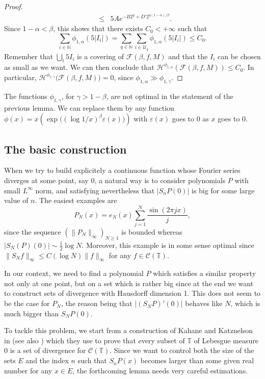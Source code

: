 \documentclass[11pt,a4paper]{amsart}
\theoremstyle{plain}
\begin{document}
\begin{proof}
\begin{eqnarray*}
&\leq&5Ae^{-B2^q+D'2^{q(1-\alpha)/\beta}}.
\end{eqnarray*}
Since $1-\alpha<\beta$, this shows that there exists $C_0<+\infty$ such that 
$$\sum_{i\in\mathbb N}\phi_{1,\alpha}(5|I_i|)=\sum_{q\in\mathbb
N}\sum_{i\in\mathcal U_q}\phi_{1,\alpha}(5|I_i|)\le C_0.$$
Remember that $\bigcup_i5I_i$ is a covering of $\mathcal F(\beta,f,M)$ and
that the $I_i$ can be chosen as small as we want. We can then conclude that 
$\mathcal H^{\phi_{1,\alpha}}(\mathcal F(\beta,f,M))\le C_0$. In particular, $\mathcal H^{\phi_{1,\gamma}}\big(\mathcal F(\beta,f,M)\big)=0$,
since $\phi_{1,\alpha}\gg\phi_{1,\gamma}$.
\end{proof}

\begin{remark}
The functions $\phi_{1,\gamma}$, for $\gamma>1-\beta$, are not optimal in the statement of the previous lemma.
We can replace them by any function $\phi(x)=x\left(\exp\big((\log 1/x)^\beta{\varepsilon}(x)\big)\right)$ with 
${\varepsilon}(x)$ goes to 0 as $x$ goes to 0.
\end{remark}

\subsection{The basic construction}
When we try to build explicitely a continuous function whose Fourier series diverges at some point, say 0, a natural way is to consider
polynomials $P$ with small $L^\infty$ norm, and satisfying nevertheless that
$|S_nP(0)|$ is big for some large value of $n$. The easiest examples are 
$$P_N(x)=e_N(x) \sum_{j=1}^N \frac{\sin(2\pi jx)}{j},$$
since the sequence $(\|P_N\|_\infty)_{N\ge 1}$ is bounded whereas $|S_N(P)(0)|\sim \frac12\log N$. Moreover, this example is in some sense optimal
since $\|S_N f\|_\infty\leq C(\log N)\|f\|_{\infty}$ for any $f\in \mathcal C({\mathbb T})$.

In our context, we need to find a polynomial $P$ which satisfies a similar property not only at one point, but on a set which is rather big since at the end we want to construct
sets of divergence with Hausdorff dimension 1. This does not seem to be the case for $P_N$, the reason being that $|(S_NP)'(0)|$ behaves like $N$, which is
much bigger than $S_NP(0)$. 

\smallskip

To tackle this problem, we start from a construction of Kahane and Katznelson in \cite{KK66} (see also \cite{Katz}) which
they use to prove
that every subset of ${\mathbb T}$ of Lebesgue measure 0 is a set of divergence for $\mathcal C({\mathbb T})$. Since we want to control
both the size of the sets $E$ and the index $n$ such that $S_n P(x)$ becomes larger than some given real number for any $x\in E$,
the forthcoming lemma needs very careful estimations.
\end{document}

